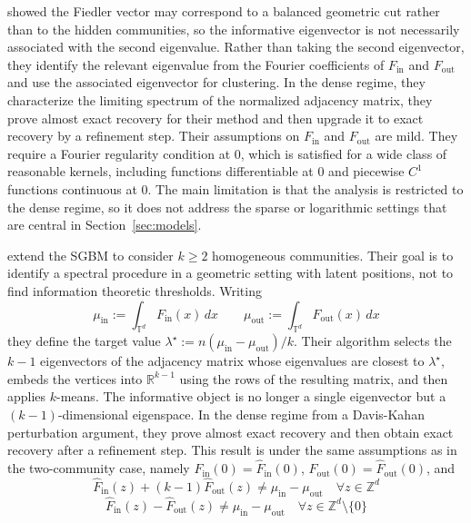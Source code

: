\documentclass[runningheads]{llncs}
\begin{document}
\citep{avrachenkov2021higher} showed the Fiedler vector may correspond to a balanced geometric cut rather than to the hidden communities, so the informative eigenvector is not necessarily associated with the second eigenvalue. Rather than taking the second eigenvector, they identify the relevant eigenvalue from the Fourier coefficients of \(F_{\mathrm{in}}\)
and
\(F_{\mathrm{out}}\) and use the associated eigenvector for clustering.
In the dense regime, they characterize the limiting spectrum of the normalized adjacency matrix, they prove almost exact recovery for their method and then upgrade it to exact recovery by a refinement step.
Their assumptions on \(F_{\mathrm{in}}\) and \(F_{\mathrm{out}}\) are mild. They require a Fourier regularity condition at \(0\), which is satisfied for a wide class of reasonable kernels, including functions differentiable at \(0\) and piecewise \(C^1\) functions continuous at \(0\). The main limitation is that the analysis is restricted to the dense regime, so it does not address the sparse or logarithmic settings that are central in Section~\ref{sec:models}.


\citep{allem2025multicommunityspectralclusteringgeometric} extend the SGBM to consider \(k \geq 2\) homogeneous communities. Their goal is to identify a spectral procedure in a geometric setting with latent positions, not to find information theoretic thresholds. 
Writing
\[
\mu_{\mathrm{in}} := \int_{\mathbb T^d} F_{\mathrm{in}}(x)\,dx
\qquad
\mu_{\mathrm{out}} := \int_{\mathbb T^d} F_{\mathrm{out}}(x)\,dx
\]
they define the target value
\(\lambda^\star := n(\mu_{\mathrm{in}}-\mu_{\mathrm{out}}) / k\).
Their algorithm selects the \(k-1\) eigenvectors of the adjacency matrix whose eigenvalues are closest to \(\lambda^\star\), embeds the vertices into \(\mathbb R^{k-1}\) using the rows of the resulting matrix, and then applies \(k\)-means. The informative object is no longer a single eigenvector but a \((k-1)\)-dimensional eigenspace. In the dense regime from a Davis-Kahan perturbation argument, they prove almost exact recovery and then obtain exact recovery after a refinement step. This result is under the same assumptions as in the two-community case, namely \(F_{\mathrm{in}}(0)=\widehat F_{\mathrm{in}}(0)\), \(F_{\mathrm{out}}(0)=\widehat F_{\mathrm{out}}(0)\), and 
\[
\widehat F_{\mathrm{in}}(z)+(k-1)\widehat F_{\mathrm{out}}(z)\neq \mu_{\mathrm{in}}-\mu_{\mathrm{out}}
\quad \forall z\in\mathbb Z^d
\]
\[
\widehat F_{\mathrm{in}}(z)-\widehat F_{\mathrm{out}}(z)\neq \mu_{\mathrm{in}}-\mu_{\mathrm{out}}
\quad \forall z\in\mathbb Z^d\setminus\{0\}
\]
\end{document}
